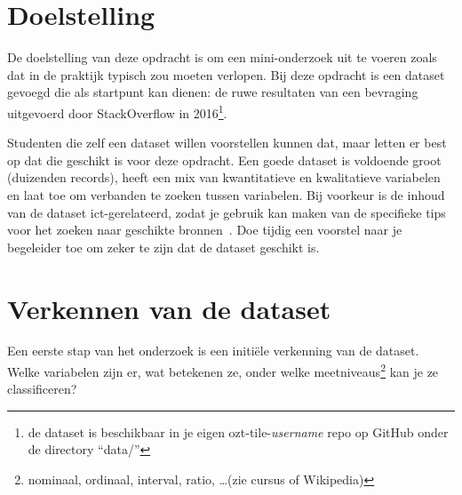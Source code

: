 \documentclass[fleqn,10pt]{voorstel}
\affiliation{\textbf{Contact:}
  \textsuperscript{1} \href{mailto:jens.buysse@hogent.be}{jens.buysse@hogent.be};
  \textsuperscript{2} \href{mailto:wim.debruyn@hogent.be}{wim.debruyn@hogent.be};
  \textsuperscript{3} \href{mailto:wim.goedertier@hogent.be}{wim.goedertier@hogent.be};
  \textsuperscript{4} \href{mailto:bert.vanvreckem@hogent.be}{bert.vanvreckem@hogent.be}}
\begin{document}
\maketitle %
\tableofcontents %
\thispagestyle{empty} %



\section{Doelstelling}

De doelstelling van deze opdracht is om een mini-onderzoek uit te voeren zoals dat in de praktijk typisch zou moeten verlopen. Bij deze opdracht is een dataset gevoegd die als startpunt kan dienen: de ruwe resultaten van een bevraging uitgevoerd door StackOverflow in 2016\footnote{de dataset is beschikbaar in je eigen ozt-tile-\emph{username} repo op GitHub onder de directory ``data/''}.

Studenten die zelf een dataset willen voorstellen kunnen dat, maar letten er best op dat die geschikt is voor deze opdracht. Een goede dataset is voldoende groot (duizenden records), heeft een mix van kwantitatieve en kwalitatieve variabelen en laat toe om verbanden te zoeken tussen variabelen. Bij voorkeur is de inhoud van de dataset ict-gerelateerd, zodat je gebruik kan maken van de specifieke tips voor het zoeken naar geschikte bronnen~\autocite{VanVreckem2017}. Doe tijdig een voorstel naar je begeleider toe om zeker te zijn dat de dataset geschikt is.


\section{Verkennen van de dataset}

Een eerste stap van het onderzoek is een initiële verkenning van de dataset. Welke variabelen zijn er, wat betekenen ze, onder welke meetniveaus\footnote{nominaal, ordinaal, interval, ratio, \ldots (zie cursus of Wikipedia)} kan je ze classificeren?
\end{document}
